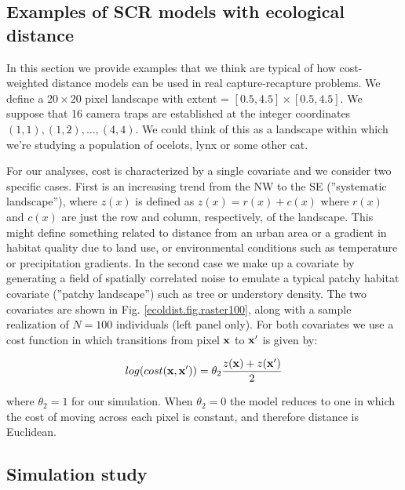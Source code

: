 \documentclass[12pt]{article}
\begin{document}
\begin{spacing}{1.8}
\section{Examples of SCR models with ecological distance}

In this section we provide examples that we think are typical of how
cost-weighted distance models can be used in real capture-recapture
problems.  We define a $20 \times 20$ pixel landscape with
extent = $[0.5, 4.5] \times [0.5, 4.5]$.
We suppose that 16 camera traps are established at the integer coordinates
$(1,1), (1,2), \ldots, (4,4)$. We could think of this as a landscape
within which we're studying a population of ocelots, lynx or some
other cat.

For our analyses, cost is characterized by a single covariate
and we consider two specific cases. First is an increasing trend from
the NW to the SE (''systematic landscape''), where $z(x)$ is defined as
$z(x) = r(x) + c(x)$ where $r(x)$ and $c(x)$ are just the row and
column, respectively, of the landscape.  This might define something
related to distance from an urban area or a gradient in habitat
quality due to land use, or environmental conditions such as
temperature or precipitation gradients.  In the second case we make up
a covariate by generating a field of spatially correlated noise to
emulate a typical patchy habitat covariate (''patchy landscape'') such as
tree or understory density. The two covariates are shown in
Fig. \ref{ecoldist.fig.raster100}, along with a sample realization of
$N=100$ individuals (left panel only).  For both covariates we use a
cost function in which transitions from pixel ${\bf x}$ to ${\bf x}'$
is given by:

\[
 log(cost({\bf x},{\bf x}'))=  \theta_2 \frac{z({\bf x}) + z({\bf x}')}{2}
\]

{\flushleft where} $\theta_2 = 1$ for our simulation.
When $\theta_2=0$ the
model reduces to one in which the cost of moving across each pixel is
constant, and therefore distance is Euclidean.

\subsection{Simulation study}


\end{spacing}
\end{document}
